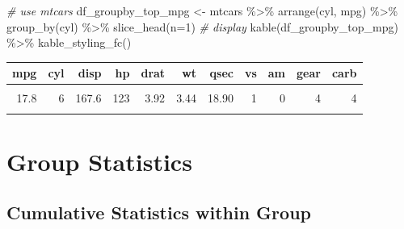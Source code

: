 \documentclass[
]{book}
\newenvironment{Shaded}{\begin{snugshade}}{\end{snugshade}}
\newcommand{\AttributeTok}[1]{\textcolor[rgb]{0.77,0.63,0.00}{#1}}
\newcommand{\CommentTok}[1]{\textcolor[rgb]{0.56,0.35,0.01}{\textit{#1}}}
\newcommand{\DecValTok}[1]{\textcolor[rgb]{0.00,0.00,0.81}{#1}}
\newcommand{\FunctionTok}[1]{\textcolor[rgb]{0.00,0.00,0.00}{#1}}
\newcommand{\NormalTok}[1]{#1}
\newcommand{\OtherTok}[1]{\textcolor[rgb]{0.56,0.35,0.01}{#1}}
\newcommand{\SpecialCharTok}[1]{\textcolor[rgb]{0.00,0.00,0.00}{#1}}
\begin{document}
\begin{Shaded}
\begin{Highlighting}[]
\CommentTok{\# use mtcars}
\NormalTok{df\_groupby\_top\_mpg }\OtherTok{\textless{}{-}}\NormalTok{ mtcars }\SpecialCharTok{\%\textgreater{}\%}
  \FunctionTok{arrange}\NormalTok{(cyl, mpg) }\SpecialCharTok{\%\textgreater{}\%}
  \FunctionTok{group\_by}\NormalTok{(cyl) }\SpecialCharTok{\%\textgreater{}\%}
  \FunctionTok{slice\_head}\NormalTok{(}\AttributeTok{n=}\DecValTok{1}\NormalTok{)}
\CommentTok{\# display}
\FunctionTok{kable}\NormalTok{(df\_groupby\_top\_mpg) }\SpecialCharTok{\%\textgreater{}\%} \FunctionTok{kable\_styling\_fc}\NormalTok{()}
\end{Highlighting}
\end{Shaded}

\begin{table}[!h]
\centering
\begin{tabular}{r|r|r|r|r|r|r|r|r|r|r}
\hline
mpg & cyl & disp & hp & drat & wt & qsec & vs & am & gear & carb\\
\hline
\cellcolor{gray!6}{21.4} & \cellcolor{gray!6}{4} & \cellcolor{gray!6}{121.0} & \cellcolor{gray!6}{109} & \cellcolor{gray!6}{4.11} & \cellcolor{gray!6}{2.78} & \cellcolor{gray!6}{18.60} & \cellcolor{gray!6}{1} & \cellcolor{gray!6}{1} & \cellcolor{gray!6}{4} & \cellcolor{gray!6}{2}\\
\hline
17.8 & 6 & 167.6 & 123 & 3.92 & 3.44 & 18.90 & 1 & 0 & 4 & 4\\
\hline
\cellcolor{gray!6}{10.4} & \cellcolor{gray!6}{8} & \cellcolor{gray!6}{472.0} & \cellcolor{gray!6}{205} & \cellcolor{gray!6}{2.93} & \cellcolor{gray!6}{5.25} & \cellcolor{gray!6}{17.98} & \cellcolor{gray!6}{0} & \cellcolor{gray!6}{0} & \cellcolor{gray!6}{3} & \cellcolor{gray!6}{4}\\
\hline
\end{tabular}
\end{table}

\hypertarget{group-statistics}{%
\section{Group Statistics}\label{group-statistics}}

\hypertarget{cumulative-statistics-within-group}{%
\subsection{Cumulative Statistics within Group}\label{cumulative-statistics-within-group}}
\end{document}
